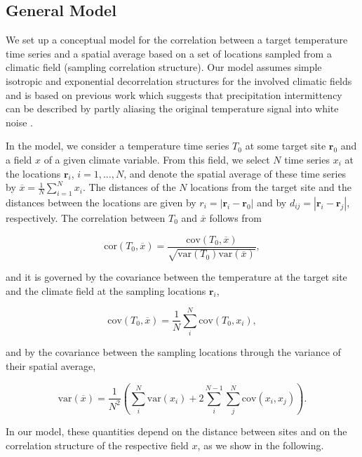 \documentclass[draft]{agujournal2019}
\begin{document}
\subsection{General Model}
\label{app:concept.model.general}

We set up a conceptual model for the correlation between a target temperature
time series and a spatial average based on a set of locations sampled from a
climatic field (sampling correlation structure). Our model assumes simple
isotropic and exponential decorrelation structures for the involved climatic
fields and is based on previous work which suggests that precipitation
intermittency can be described by partly aliasing the original temperature
signal into white noise \cite{Laepple2018}.

In the model, we consider a temperature time series $T_0$ at some target site
$\mathbf{r}_0$ and a field $x$ of a given climate variable. From this field, we
select $N$ time series $x_i$ at the locations $\mathbf{r}_i$, $i=1,\dotsc,N$,
and denote the spatial average of these time series by
$\overline{x}=\frac{1}{N}\sum_{i=1}^{N}{x_i}$. The distances of the $N$
locations from the target site and the distances between the locations are given
by $r_i=|\mathbf{r}_i-\mathbf{r}_0|$ and by
$d_{ij}=|{\mathbf{r}_i-\mathbf{r}_j}|$, respectively. The correlation between
$T_0$ and $\overline{x}$ follows from
%
\begin{linenomath*}
\begin{equation}
\label{eq:corr.general}
\mathrm{cor}(T_0,\overline{x})=\frac
{\mathrm{cov}(T_0,\overline{x})}
{\sqrt{\mathrm{var}(T_0)\mathrm{var}(\overline{x})}},
\end{equation}
\end{linenomath*}
and it is governed by the covariance between the temperature at the target site
and the climate field at the sampling locations $\mathbf{r}_i$,
%
\begin{linenomath*}
\begin{equation}
\label{eq:cov.general}
\mathrm{cov}(T_0,\overline{x})=
\frac{1}{N}\sum_{i}^{N}{\mathrm{cov}(T_0,x_i)},
\end{equation}
\end{linenomath*}
%
and by the covariance between the sampling locations through the variance of
their spatial average,
\begin{linenomath*}
\begin{equation}
\label{eq:var.general}
\mathrm{var}(\overline{x})=
\frac{1}{N^2}\left(
\sum_{i}^{N}{\mathrm{var}(x_i)} +
2\sum_{i}^{N-1}\sum_{j}^{N}{\mathrm{cov}(x_i,x_j)}
\right).
\end{equation}
\end{linenomath*}
%
In our model, these quantities depend on the distance between sites and on the
correlation structure of the respective field $x$, as we show in the following.
\end{document}

